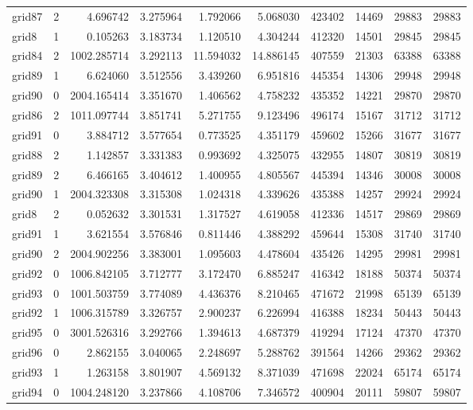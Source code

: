 \begin{longtable}{|l|r|r|r|r|r|r|r|r|r|}
grid87 & 2 & 4.696742 & 3.275964 & 1.792066 & 5.068030 & 423402 & 14469 & 29883 & 29883 \\
grid8 & 1 & 0.105263 & 3.183734 & 1.120510 & 4.304244 & 412320 & 14501 & 29845 & 29845 \\
grid84 & 2 & 1002.285714 & 3.292113 & 11.594032 & 14.886145 & 407559 & 21303 & 63388 & 63388 \\
grid89 & 1 & 6.624060 & 3.512556 & 3.439260 & 6.951816 & 445354 & 14306 & 29948 & 29948 \\
grid90 & 0 & 2004.165414 & 3.351670 & 1.406562 & 4.758232 & 435352 & 14221 & 29870 & 29870 \\
grid86 & 2 & 1011.097744 & 3.851741 & 5.271755 & 9.123496 & 496174 & 15167 & 31712 & 31712 \\
grid91 & 0 & 3.884712 & 3.577654 & 0.773525 & 4.351179 & 459602 & 15266 & 31677 & 31677 \\
grid88 & 2 & 1.142857 & 3.331383 & 0.993692 & 4.325075 & 432955 & 14807 & 30819 & 30819 \\
grid89 & 2 & 6.466165 & 3.404612 & 1.400955 & 4.805567 & 445394 & 14346 & 30008 & 30008 \\
grid90 & 1 & 2004.323308 & 3.315308 & 1.024318 & 4.339626 & 435388 & 14257 & 29924 & 29924 \\
grid8 & 2 & 0.052632 & 3.301531 & 1.317527 & 4.619058 & 412336 & 14517 & 29869 & 29869 \\
grid91 & 1 & 3.621554 & 3.576846 & 0.811446 & 4.388292 & 459644 & 15308 & 31740 & 31740 \\
grid90 & 2 & 2004.902256 & 3.383001 & 1.095603 & 4.478604 & 435426 & 14295 & 29981 & 29981 \\
grid92 & 0 & 1006.842105 & 3.712777 & 3.172470 & 6.885247 & 416342 & 18188 & 50374 & 50374 \\
grid93 & 0 & 1001.503759 & 3.774089 & 4.436376 & 8.210465 & 471672 & 21998 & 65139 & 65139 \\
grid92 & 1 & 1006.315789 & 3.326757 & 2.900237 & 6.226994 & 416388 & 18234 & 50443 & 50443 \\
grid95 & 0 & 3001.526316 & 3.292766 & 1.394613 & 4.687379 & 419294 & 17124 & 47370 & 47370 \\
grid96 & 0 & 2.862155 & 3.040065 & 2.248697 & 5.288762 & 391564 & 14266 & 29362 & 29362 \\
grid93 & 1 & 1.263158 & 3.801907 & 4.569132 & 8.371039 & 471698 & 22024 & 65174 & 65174 \\
grid94 & 0 & 1004.248120 & 3.237866 & 4.108706 & 7.346572 & 400904 & 20111 & 59807 & 59807 \\

\end{longtable}
